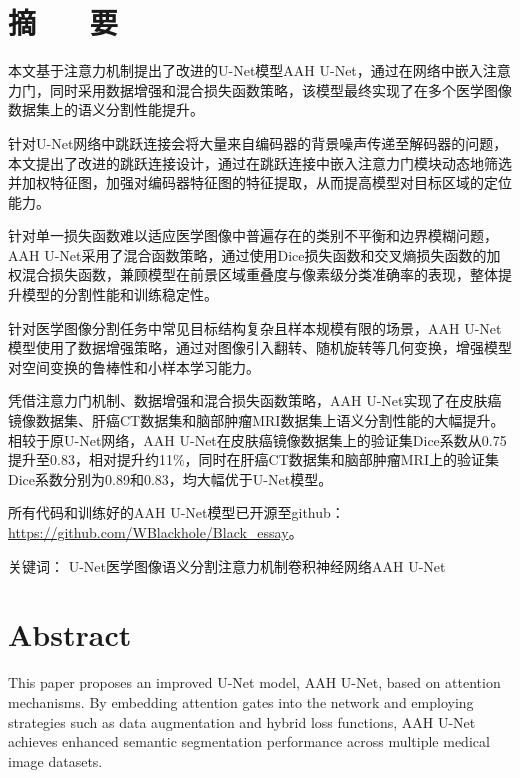 \section*{ \centering 摘 ~~ 要}

\vskip0.5cm

本文基于注意力机制提出了改进的U-Net模型AAH U-Net，通过在网络中嵌入注意力门，同时采用数据增强和混合损失函数策略，该模型最终实现了在多个医学图像数据集上的语义分割性能提升。

针对U-Net网络中跳跃连接会将大量来自编码器的背景噪声传递至解码器的问题，本文提出了改进的跳跃连接设计，通过在跳跃连接中嵌入注意力门模块动态地筛选并加权特征图，加强对编码器特征图的特征提取，从而提高模型对目标区域的定位能力。

针对单一损失函数难以适应医学图像中普遍存在的类别不平衡和边界模糊问题，AAH U-Net采用了混合函数策略，通过使用Dice损失函数和交叉熵损失函数的加权混合损失函数，兼顾模型在前景区域重叠度与像素级分类准确率的表现，整体提升模型的分割性能和训练稳定性。

针对医学图像分割任务中常见目标结构复杂且样本规模有限的场景，AAH U-Net模型使用了数据增强策略，通过对图像引入翻转、随机旋转等几何变换，增强模型对空间变换的鲁棒性和小样本学习能力。

凭借注意力门机制、数据增强和混合损失函数策略，AAH U-Net实现了在皮肤癌镜像数据集、肝癌CT数据集和脑部肿瘤MRI数据集上语义分割性能的大幅提升。相较于原U-Net网络，AAH U-Net在皮肤癌镜像数据集上的验证集Dice系数从0.75提升至0.83，相对提升约11\%，同时在肝癌CT数据集和脑部肿瘤MRI上的验证集Dice系数分别为0.89和0.83，均大幅优于U-Net模型。

所有代码和训练好的AAH U-Net模型已开源至github：\url{https://github.com/WBlackhole/Black_essay}。

{ \heiti 关键词：} U-Net\quad 医学图像语义分割\quad 注意力机制\quad 卷积神经网络\quad AAH U-Net

\vskip0.5cm


\clearpage
\section*{ \centering \textbf{Abstract} }

This paper proposes an improved U-Net model, AAH U-Net, based on attention mechanisms. By embedding attention gates into the network and employing strategies such as data augmentation and hybrid loss functions, AAH U-Net achieves enhanced semantic segmentation performance across multiple medical image datasets.


